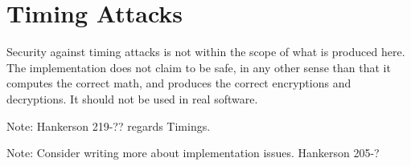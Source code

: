 \section{Timing Attacks}

Security against timing attacks is not within the scope of what is produced here. The implementation
does not claim to be safe, in any other sense than that it computes the correct math, and produces
the correct encryptions and decryptions. It should not be used in real software.

Note: Hankerson 219-?? regards Timings.

Note: Consider writing more about implementation issues. Hankerson 205-?